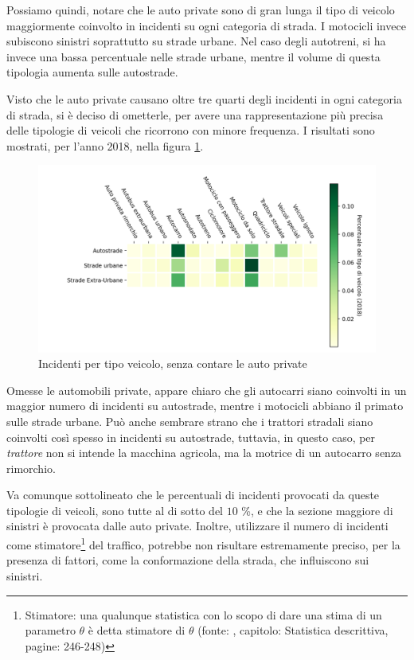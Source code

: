 \documentclass[a4paper,12pt]{report}
\newcommand{\quotestyle}[1]{\textit{#1}}
\begin{document}
Possiamo quindi, notare che le auto private sono di gran lunga il tipo di veicolo 
maggiormente coinvolto in incidenti su ogni categoria di strada. 
I motocicli invece subiscono sinistri soprattutto su strade urbane.
Nel caso degli autotreni, si ha invece una bassa percentuale nelle strade 
urbane, mentre il volume di questa tipologia aumenta sulle autostrade. 

Visto che le auto private causano oltre tre quarti degli 
incidenti in ogni categoria di strada,  
si è deciso di ometterle, per avere una rappresentazione più 
precisa delle tipologie di veicoli che ricorrono con minore frequenza. 
I risultati sono mostrati, per l'anno 2018, 
nella figura \ref{fig:differenza-strade-no-auto}. 

\begin{figure}
    \includegraphics[width=\linewidth]{../src/incidenti/incidenti_senza_coords/tipo_veicoli/differenza_senza_auto.png}
    \caption{Incidenti per tipo veicolo, senza contare le auto private}
    \label{fig:differenza-strade-no-auto}
\end{figure}

Omesse le automobili private, appare chiaro che gli autocarri siano coinvolti in un maggior 
numero di incidenti su autostrade, mentre i motocicli abbiano il primato sulle strade urbane. 
Può anche sembrare strano che i trattori stradali siano coinvolti così spesso in incidenti 
su autostrade, tuttavia, in questo caso, per \quotestyle{trattore} non si intende la macchina 
agricola, ma la motrice di un autocarro senza rimorchio. 

Va comunque sottolineato che le percentuali di incidenti provocati da queste tipologie di 
veicoli, sono tutte al di sotto del $10$ \%, e che la sezione maggiore di sinistri è 
provocata dalle auto private. 
Inoltre, utilizzare il numero di incidenti come 
stimatore\footnote{Stimatore: una qualunque statistica con 
lo scopo di dare una stima di un parametro $\theta$ è detta stimatore 
di $\theta$ (fonte: \cite{PROB_E_STATISTICA:1}, 
capitolo: Statistica descrittiva, pagine: 246-248)} del traffico, potrebbe non risultare 
estremamente preciso, per la presenza di fattori, come la conformazione della strada, che 
influiscono sui sinistri. 
\end{document}

